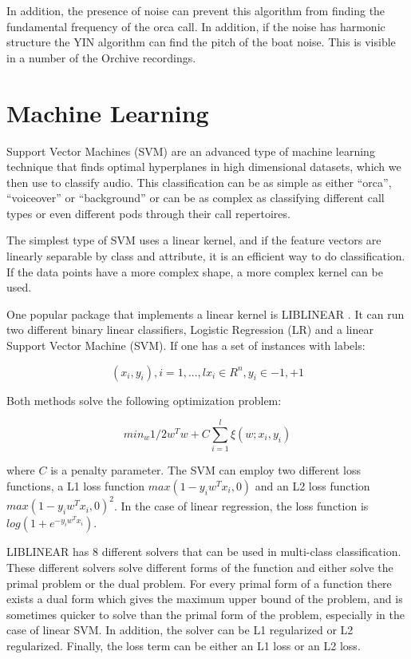 In addition, the presence of noise can prevent this algorithm from
finding the fundamental frequency of the orca call.  In addition, if
the noise has harmonic structure the YIN algorithm can find the pitch
of the boat noise.  This is visible in a number of the Orchive
recordings.

\section{Machine Learning}

Support Vector Machines (SVM) \cite{cortes1995svm} are an advanced
type of machine learning technique that finds optimal hyperplanes in
high dimensional datasets, which we then use to classify audio.  This
classification can be as simple as either ``orca'', ``voiceover'' or
``background'' or can be as complex as classifying different call
types or even different pods through their call repertoires.

The simplest type of SVM uses a linear kernel, and if the feature
vectors are linearly separable by class and attribute, it is an
efficient way to do classification.  If the data points have a more
complex shape, a more complex kernel can be used.

One popular package that implements a linear kernel is LIBLINEAR
\cite{rongen2008liblinear}.  It can run two different binary linear
classifiers, Logistic Regression (LR) and a linear Support Vector
Machine (SVM).  If one has a set of instances with labels:

\begin{equation} 
(x_i, y_i), i=1,...,l x_i \in R^n, y_i \in {-1,+1} 
\end{equation}

Both methods solve the following optimization problem:

\begin{equation} 
min_w  1/2 w^T w + C \sum_{i=1}^l{\xi(w;x_i,y_i)} 
\end{equation}

\noindent where $C$ is a penalty parameter.  The SVM can employ two different loss
functions, a L1 loss function $max(1-y_i w^T x_i, 0)$ and an L2 loss
function $max(1-y_i w^T x_i, 0)^2$.  In the case of linear regression,
the loss function is $log(1+ e^{-y_i w^T x_i})$.

LIBLINEAR has 8 different solvers that can be used in multi-class
classification.  These different solvers solve different forms of the
function and either solve the primal problem or the dual problem.  For
every primal form of a function there exists a dual form which gives
the maximum upper bound of the problem, and is sometimes quicker to
solve than the primal form of the problem, especially in the case of
linear SVM.  In addition, the solver can be L1 regularized or L2
regularized.  Finally, the loss term can be either an L1 loss or an L2
loss.

